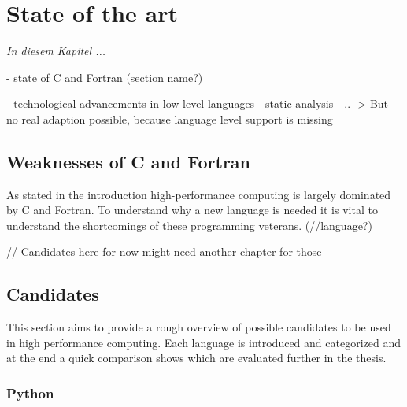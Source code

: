 \chapter{State of the art}
\label{chap:State_of_the_art}

\textit{%
In diesem Kapitel ...
}
\bigskip

- state of C and Fortran (section name?)

- technological advancements in low level languages
    - static analysis
    - ..
    -> But no real adaption possible, because language level support is missing

\section{Weaknesses of C and Fortran} %
\label{sec:Weaknesses_C_Fortran}

As stated in the introduction high-performance computing is largely dominated by C and Fortran. To understand why a new language is needed it is vital to understand the shortcomings of these programming veterans. (//language?)

// Candidates here for now might need another chapter for those
\section{Candidates}
\label{sec:Candidates}

This section aims to provide a rough overview of possible candidates to be used in high performance computing. Each language is introduced and categorized and at the end a quick comparison shows which are evaluated further in the thesis.

\subsection*{Python}
\label{ssec:Candidates.Python}

